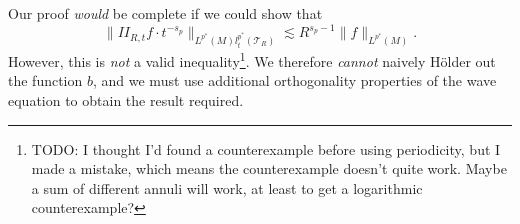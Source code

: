 %
Our proof \emph{would} be complete if we could show that
%
\[ \| II_{R,t} f \cdot t^{-s_p} \|_{L^{p^*}(M) l^{p^*}_t(\mathcal{T}_R)} \lesssim R^{s_p - 1} \| f \|_{L^{p^*}(M)}. \]
%
However, this is \emph{not} a valid inequality\footnote{TODO: I thought I'd found a counterexample before using periodicity, but I made a mistake, which means the counterexample doesn't quite work. Maybe a sum of different annuli will work, at least to get a logarithmic counterexample?}. We therefore \emph{cannot} naively H\"{o}lder out the function $b$, and we must use additional orthogonality properties of the wave equation to obtain the result required.

\begin{comment}

Using periodicity, if $R$ is divisible by $1/2$, then we can write
%
\begin{align*}
    &\int_{1/R \lesssim |t| \leq 1/2} \| e^{2 \pi i t P} f \|^{p^*}_{L^{p^*}(M)}\\
    &\quad \approx \frac{1}{2R} \int_{1/R \lesssim |t| \lesssim R} \| e^{2 \pi i t P} f \|_{L^{p^*}(M)}^{p^*}\; dt - (1 - 1/2R) \int_{|t| \lesssim 1/R} \| e^{2 \pi i t P} f \|_{L^{p^*}(M)}^{p^*}\; dt.
\end{align*}
%
The first term is just a rescaled local smoothing term. If $f$ is badly behaved, we can therefore expect to have
%
\begin{align*}
    \frac{1}{2R} \int_{1/R \lesssim |t| \lesssim R} \| e^{2 \pi i t P} f \|_{L^{p^*}(M)}^{p^*}\; dt &\approx R^{s_{p^*} p^*} \| f \|_{L^{p^*}(M)}^{p^*}\\
    &= R^{(d-1)(p^*/2 - 1) - 1} \| f \|_{L^{p^*}(M)}^{p^*}
\end{align*}
%
whereas we should also expect by pseudolocal finite speed of propogation and the intuitive local constancy of $f$ on scales $1/R$ that
%
\begin{align*}
    \int_{|t| \lesssim 1/R} |e^{2 \pi i t P} f|^{p^*}\; dt &\approx \| f \|_{L^{p^*}(M)}^{p^*}.
\end{align*}
%
Thus in the range of $p^*$ we are considering, the first term has much larger $L^p$ norm, and thus cannot be cancelled out by subtracting the second term. We thus conclude that in the worst case, we should expect
%
\[ \left( \int_{1/R \lesssim |t| \leq 1/2} \| e^{2 \pi i t P} f \|_{L^{p^*}(M)}^{p^*} \right)^{1/p^*} \gtrsim R^{(d-1)(1/2 - 1/p^*) - 1/p^*} \| f \|_{L^{p^*}(M)}. \]
%


\end{comment}

